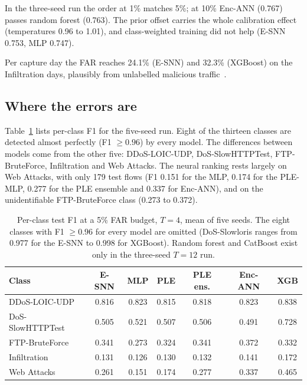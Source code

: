 \documentclass[conference]{IEEEtran}
\begin{document}
In the three-seed run the order at 1\% matches 5\%; at 10\% Enc-ANN (0.767) passes random forest (0.763). The prior offset carries the whole calibration effect (temperatures 0.96 to 1.01), and class-weighted training did not help (E-SNN 0.753, MLP 0.747).

Per capture day the FAR reaches 24.1\% (E-SNN) and 32.3\% (XGBoost) on the Infiltration days, plausibly from unlabelled malicious traffic~\cite{liu2022}.

\subsection{Where the errors are}
\label{sec:errors}

Table~\ref{tab:perclass} lists per-class F1 for the five-seed run. Eight of the thirteen classes are detected almost perfectly (F1 $\geq 0.96$) by every model. The differences between models come from the other five: DDoS-LOIC-UDP, DoS-SlowHTTPTest, FTP-BruteForce, Infiltration and Web Attacks. The neural ranking rests largely on Web Attacks, with only 179 test flows (F1 0.151 for the MLP, 0.174 for the PLE-MLP, 0.277 for the PLE ensemble and 0.337 for Enc-ANN), and on the unidentifiable FTP-BruteForce class (0.273 to 0.372).

\begin{table}[t]
\centering
\caption{Per-class test F1 at a 5\% FAR budget, $T = 4$, mean of five seeds. The eight classes with F1 $\geq 0.96$ for every model are omitted (DoS-Slowloris ranges from 0.977 for the E-SNN to 0.998 for XGBoost). Random forest and CatBoost exist only in the three-seed $T = 12$ run.}
\label{tab:perclass}
\setlength{\tabcolsep}{1.6pt}
\begin{tabular}{lcccccc}
\toprule
Class & E-SNN & MLP & PLE & PLE ens. & Enc-ANN & XGB \\
\midrule
DDoS-LOIC-UDP & 0.816 & 0.823 & 0.815 & 0.818 & 0.823 & 0.838 \\
DoS-SlowHTTPTest & 0.505 & 0.521 & 0.507 & 0.506 & 0.491 & 0.728 \\
FTP-BruteForce & 0.341 & 0.273 & 0.324 & 0.341 & 0.372 & 0.332 \\
Infiltration & 0.131 & 0.126 & 0.130 & 0.132 & 0.141 & 0.172 \\
Web Attacks & 0.261 & 0.151 & 0.174 & 0.277 & 0.337 & 0.465 \\
\bottomrule
\end{tabular}
\end{table}
\end{document}
